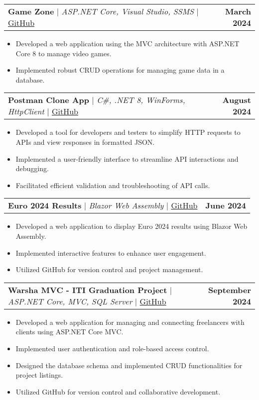 \documentclass[letterpaper,11pt]{article}
\makeatletter
\newcommand{\resumeItem}[1]{
  \item\small{
    {#1 \vspace{-2pt}}
  }
}
\newcommand{\resumeProjectHeading}[2]{
    \item
    \begin{tabular*}{1.001\textwidth}{l@{\extracolsep{\fill}}r}
      \small#1 & \textbf{\small #2}\\
    \end{tabular*}\vspace{-7pt}
}
\newcommand{\resumeItemListStart}{\begin{itemize}}
\newcommand{\resumeItemListEnd}{\end{itemize}\vspace{-5pt}}
\makeatother
\begin{document}
  \resumeProjectHeading
      {\textbf{Game Zone} $|$ \emph{ASP.NET Core, Visual Studio, SSMS} $|$ \textcolor{blue}{\href{https://github.com/yourusername/game-zone}{GitHub}}}{March 2024}
      \resumeItemListStart
        \resumeItem{Developed a web application using the MVC architecture with ASP.NET Core 8 to manage video games.}
        \resumeItem{Implemented robust CRUD operations for managing game data in a database.}
      \resumeItemListEnd 
      \vspace{-13pt}
  
  \resumeProjectHeading
      {\textbf{Postman Clone App} $|$ \emph{C\#, .NET 8, WinForms, HttpClient} $|$ \textcolor{blue}{\href{https://github.com/ziadhanii/postman-clone-app}{GitHub}}}{August 2024}
      \resumeItemListStart
        \resumeItem{Developed a tool for developers and testers to simplify HTTP requests to APIs and view responses in formatted JSON.}
        \resumeItem{Implemented a user-friendly interface to streamline API interactions and debugging.}
        \resumeItem{Facilitated efficient validation and troubleshooting of API calls.}
      \resumeItemListEnd 
      \vspace{-13pt}
  
  \resumeProjectHeading
      {\textbf{Euro 2024 Results} $|$ \emph{Blazor Web Assembly} $|$ \textcolor{blue}{\href{https://github.com/ziadhanii/euro-2024-results-using-blazor-web-assembly}{GitHub}}}{June 2024}
      \resumeItemListStart
        \resumeItem{Developed a web application to display Euro 2024 results using Blazor Web Assembly.}
        \resumeItem{Implemented interactive features to enhance user engagement.}
        \resumeItem{Utilized GitHub for version control and project management.}
      \resumeItemListEnd 
      \vspace{-13pt}
  
  \resumeProjectHeading
      {\textbf{Warsha MVC - ITI Graduation Project} $|$ \emph{ASP.NET Core, MVC, SQL Server} $|$ \textcolor{blue}{\href{https://github.com/ziadhanii/iti-graduation-project-warsha-mvc}{GitHub}}}{September 2024}
      \resumeItemListStart
        \resumeItem{Developed a web application for managing and connecting freelancers with clients using ASP.NET Core MVC.}
        \resumeItem{Implemented user authentication and role-based access control.}
        \resumeItem{Designed the database schema and implemented CRUD functionalities for project listings.}
        \resumeItem{Utilized GitHub for version control and collaborative development.}
      \resumeItemListEnd 
      \vspace{-13pt}
  
\end{document}
